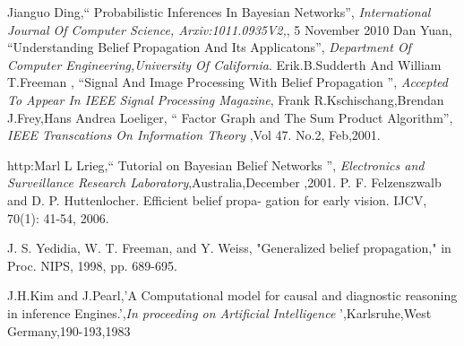 \begin{thebibliography}{1}
Jianguo Ding,`` Probabilistic Inferences In Bayesian Networks'', \emph{International Journal Of Computer Science, Arxiv:1011.0935V2,}, 5 November 2010
 Dan Yuan, ``Understanding Belief Propagation And Its Applicatons'', \emph{Department Of Computer Engineering,University Of California}.
 Erik.B.Sudderth And William T.Freeman , ``Signal And Image Processing With Belief Propagation '', \emph{Accepted To Appear In IEEE Signal Processing Magazine},
%
%
Frank R.Kschischang,Brendan J.Frey,Hans Andrea Loeliger, `` Factor Graph and The Sum Product Algorithm'', \emph{IEEE Transcations On Information Theory} ,Vol 47. No.2, Feb,2001.

%
http:Marl L Lrieg,`` Tutorial on Bayesian Belief Networks '', \emph{Electronics and Surveillance Research Laboratory},Australia,December ,2001.
%
P. F. Felzenszwalb and D. P. Huttenlocher. Efficient belief propa-
gation for early vision. IJCV, 70(1): 41-54, 2006.

 
J. S. Yedidia, W. T. Freeman, and Y. Weiss, "Generalized belief
     propagation," in Proc. NIPS, 1998, pp. 689-695.


J.H.Kim and J.Pearl,'A Computational model for causal and diagnostic reasoning in inference Engines.',\emph {In proceeding on Artificial Intelligence }',Karlsruhe,West Germany,190-193,1983


\end{thebibliography}
